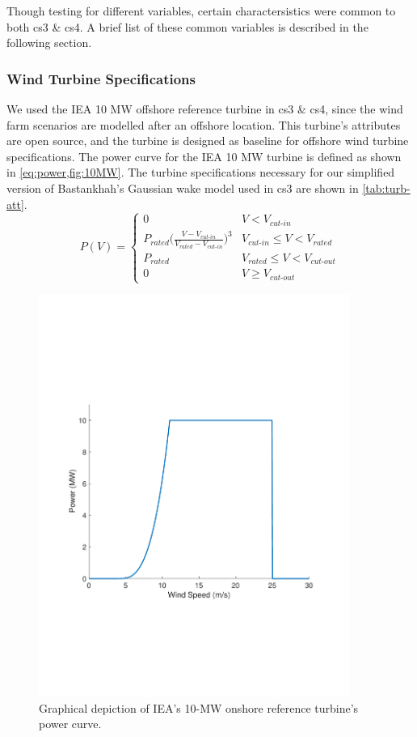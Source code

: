 Though testing for different variables, certain charactersistics were common to both cs3 {\&} cs4.
A brief list of these common variables is described in the following section.

\subsubsection{Wind Turbine Specifications} \label{sec:turb}
	We used the IEA 10 MW offshore reference turbine\cite{NREL335MW} in cs3 \& cs4, since the wind farm scenarios are modelled after an offshore location.
	This turbine's attributes are open source, and the turbine is designed as baseline for offshore wind turbine specifications.
	The power curve for the IEA 10 MW turbine is defined as shown in \cref{eq:power,fig:10MW}.
	The turbine specifications necessary for our simplified version of Bastankhah's Gaussian wake model used in cs3 are shown in \cref{tab:turb-att}.
	\begin{equation}\label{eq:power}
		P(V) = 
		\begin{cases} 
			0 & V < V_{\textit{cut-in}} \\
			P_{\textit{rated}}\bigg(\frac{V-V_{\textit{cut-in}}}{V_{\textit{rated}}-V_{\textit{cut-in}}}\bigg)^3 & V_{\textit{cut-in}}\leq V < V_{\textit{rated}} \\
			P_{\textit{rated}} & V_{\textit{rated}} \leq V < V_{\textit{cut-out}} \\
			0 & V \geq V_{\textit{cut-out}}
		\end{cases}
	\end{equation}
	\begin{figure}[H]
	    \centering
	    \includegraphics[width=4.0in, trim=0.8in 2.5in 1.0in 2.9in, clip]{./figures/iea37-10mw-pcurve.pdf}
	    \caption{Graphical depiction of IEA's 10-MW onshore reference turbine's power curve.}
	    \label{fig:10MW}
	\end{figure}
